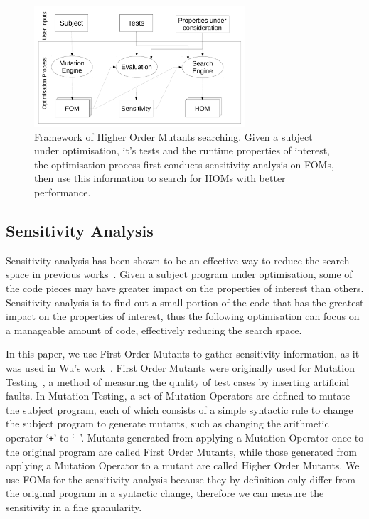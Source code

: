 \documentclass[oribibl]{llncs}
\begin{document}
\begin{figure}[h]
\centering
\includegraphics[width=0.7\textwidth]{framework}
\caption{Framework of Higher Order Mutants searching. Given a subject under optimisation, it's tests and the runtime properties of interest, the optimisation process first conducts sensitivity analysis on FOMs, then use this information to search for HOMs with better performance.}\label{fig_framework}
\end{figure}

\subsection{Sensitivity Analysis}
\label{sec_sensitivity}

Sensitivity analysis has been shown to be an effective way to reduce the search space in previous works~\cite{6733370,Bruce:2015:REC:2739480.2754752,6035728}.
Given a subject program under optimisation, some of the code pieces may have greater impact on the properties of interest than others.
Sensitivity analysis is to find out a small portion of the code that has the greatest impact on the properties of interest, thus the following optimisation can focus on a manageable amount of code, effectively reducing the search space.

In this paper, we use First Order Mutants to gather sensitivity information, as it was used in Wu's work~\cite{Wu:2015:DPO:2739480.2754648}.
First Order Mutants were originally used for Mutation Testing~\cite{demillo1978hints}, a method of measuring the quality of test cases by inserting artificial faults.
In Mutation Testing, a set of Mutation Operators are defined to mutate the subject program, each of which consists of a simple syntactic rule to change the subject program to generate mutants, such as changing the arithmetic operator `\texttt{+}' to `\texttt{-}'.
Mutants generated from applying a Mutation Operator once to the original program are called First Order Mutants, while those generated from applying a Mutation Operator to a mutant are called Higher Order Mutants.
We use FOMs for the sensitivity analysis because they by definition only differ from the original program in a syntactic change, therefore we can measure the sensitivity in a fine granularity.
\end{document}
